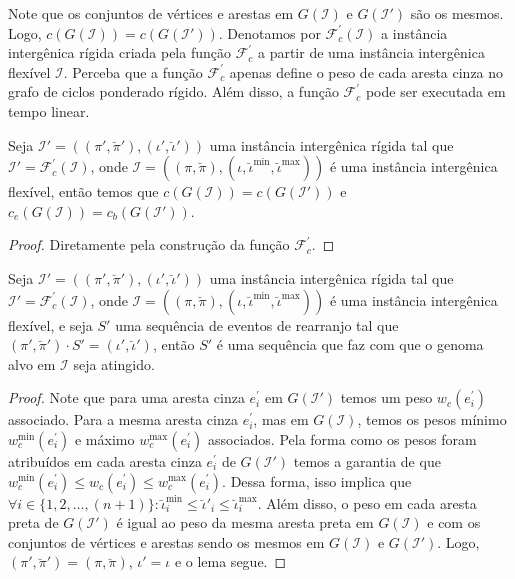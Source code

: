 Note que os conjuntos de vértices e arestas em $G(\mathcal{I})$ e $G(\mathcal{I}')$ são os mesmos. Logo, $c(G(\mathcal{I})) = c(G(\mathcal{I}'))$. Denotamos por $\mathcal{F}_{c}^{'}(\mathcal{I})$ a instância intergênica rígida criada pela função $\mathcal{F}_{c}^{'}$ a partir de uma instância intergênica flexível $\mathcal{I}$. Perceba que a função $\mathcal{F}_{c}^{'}$ apenas define o peso de cada aresta cinza no grafo de ciclos ponderado rígido. Além disso, a função $\mathcal{F}_{c}^{'}$ pode ser executada em tempo linear.

\begin{lemma}\label{lemma:AOKHMVAY}
Seja $\mathcal{I'} = ((\pi',\breve\pi'),(\iota',\breve\iota'))$ uma instância intergênica rígida tal que $\mathcal{I'} = \mathcal{F}_{c}^{'}(\mathcal{I})$, onde $\mathcal{I} = ((\pi,\breve\pi),(\iota,\breve\iota^{\min},\breve\iota^{\max}))$ é uma instância intergênica flexível, então temos que $c(G(\mathcal{I})) = c(G(\mathcal{I}'))$ e $c_e(G(\mathcal{I})) = c_b(G(\mathcal{I}'))$.
\end{lemma}
\begin{proof}
Diretamente pela construção da função $\mathcal{F}_{c}^{'}$.
\end{proof}

\begin{lemma}\label{lemma:TQUNQUGX}
Seja $\mathcal{I'} = ((\pi',\breve\pi'),(\iota',\breve\iota'))$ uma instância intergênica rígida tal que $\mathcal{I'} = \mathcal{F}_{c}^{'}(\mathcal{I})$, onde $\mathcal{I} = ((\pi,\breve\pi),(\iota,\breve\iota^{\min},\breve\iota^{\max}))$ é uma instância intergênica flexível, e seja $S'$ uma sequência de eventos de rearranjo tal que $(\pi',\breve\pi') \cdot S' = (\iota',\breve\iota')$, então $S'$ é uma sequência que faz com que o genoma alvo em $\mathcal{I}$ seja atingido.
\end{lemma}
\begin{proof}
Note que para uma aresta cinza $e^{\prime}_i$ em $G(\mathcal{I}')$ temos um peso $w_c(e^{\prime}_i)$ associado. Para a mesma aresta cinza $e^{\prime}_i$, mas em $G(\mathcal{I})$, temos os pesos mínimo $w^{\min}_c(e^{\prime}_i)$ e máximo $w^{\max}_c(e^{\prime}_i)$ associados. Pela forma como os pesos foram atribuídos em cada aresta cinza $e^{\prime}_i$ de $G(\mathcal{I}')$ temos a garantia de que $w^{\min}_c(e^{\prime}_i) \le w_c(e^{\prime}_i) \le w^{\max}_c(e^{\prime}_i)$. Dessa forma, isso implica que $\forall i \in \{1,2,\dots,({n+1})\}: \breve\iota^{\min}_i \le \breve\iota'_i \le \breve\iota^{\max}_i$. Além disso, o peso em cada aresta preta de $G(\mathcal{I}')$ é igual ao peso da mesma aresta preta em $G(\mathcal{I})$ e com os conjuntos de vértices e arestas sendo os mesmos em $G(\mathcal{I})$ e $G(\mathcal{I}')$. Logo, $(\pi',\breve\pi') = (\pi,\breve\pi)$, $\iota' = \iota$ e o lema segue.
\end{proof}

